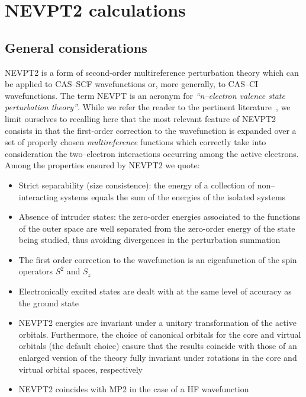 \chapter{NEVPT2 calculations}\label{ch:nevpt2}

\section{General considerations}\label{sec:nevptgeneral}
NEVPT2  is a form of second-order multireference
perturbation theory 
which can be applied to CAS--SCF wavefunctions or, more generally, to
CAS--CI wavefunctions. The term NEVPT is an acronym for
\textit{``n--electron valence state perturbation theory''}. While we
refer the reader to the pertinent
literature~\cite{nevpt1,nevpt2,nevpt3,nevpt4}, we limit ourselves to
recalling here that the most relevant feature of NEVPT2 consists in
that the first-order correction to the wavefunction is expanded over a
set of properly chosen \emph{multireference} functions which correctly
take into consideration the two--electron interactions occurring among
the active electrons. Among the properties ensured by NEVPT2 we quote:

\begin{itemize}
\item Strict separability (size consistence): the energy of a
  collection of non--interacting systems equals the sum of the
  energies of the isolated systems
\item Absence of intruder states: the zero-order energies associated
  to the functions of the outer space are well separated from the
  zero-order energy of the state being studied, thus avoiding
  divergences in   the perturbation summation
\item The first order correction to the wavefunction is an
  eigenfunction of the spin operators $S^2$ and $S_z$
\item Electronically excited states are dealt with at the same level
  of accuracy as the ground state
\item NEVPT2 energies are invariant under a unitary transformation of
  the active orbitals. Furthermore, the choice of canonical orbitals
  for the core and virtual orbitals (the default choice) ensure that
  the results coincide with those of an enlarged version of the theory
  fully invariant under rotations in the core and virtual orbital
  spaces, respectively\cite{nevpt4}
\item NEVPT2 coincides with MP2 in the case of a HF wavefunction
\end{itemize}

